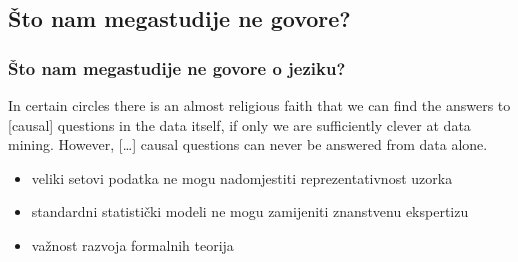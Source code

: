\documentclass{beamer}
\newcommand{\tinycitep}[1]{%
    \bgroup
    \scriptsize
    \citep{#1}
    \egroup}
\begin{document}
\subsection{Što nam megastudije ne govore?}

\begin{frame}
    \frametitle{Što nam megastudije ne govore o jeziku?}

    \hspace*{\fill}
    \raisebox{37.4pt}{
        \begin{minipage}[t]{1em}
            \fontsize{56}{66}\selectfont
            \bfseries
            ,,
        \end{minipage}
    }
    \begin{minipage}{24em}
        In certain circles there is an almost religious faith that we can find
        the answers to [causal] questions in the data itself, if only we are
        sufficiently clever at data mining. However, [\ldots] causal questions
        can never be answered from data alone.

        \bigskip

        \raggedleft
        \scriptsize
        \citet[str. 351]{pearlBookWhyNew2018}
    \end{minipage}
    \hspace*{\fill}

\end{frame}

\begin{frame}
    \begin{itemize}
        \item veliki setovi podatka ne mogu nadomjestiti reprezentativnost
            uzorka \tinycitep{mengStatisticalParadisesParadoxes2018}

        \pause

        \item standardni statistički modeli ne mogu zamijeniti znanstvenu
            ekspertizu
            \bgroup
            \scriptsize
            \citep[str. 526]{mcelreathStatisticalRethinkingBayesian2020}
            \egroup

        \pause

        \item važnost razvoja formalnih teorija
            \tinycitep{fiedlerToolsToysTruisms2004,
            navarroIfMathematicalPsychology2020,navarroDevilDeepBlue2019}
    \end{itemize}
\end{frame}
\end{document}
